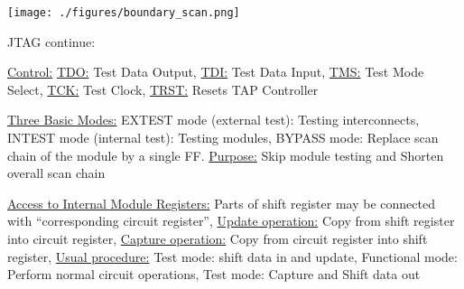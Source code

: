 \documentclass[landscape, a4paper]{article}
\begin{document}
\begin{minipage}[t]{0.2\linewidth}
\begin{betterlist}
		\texttt{[image: ./figures/boundary\_scan.png]}
		\item \alert{JTAG continue:}
		\begin{betterlist}
			\item \underline{Control:} \underline{TDO:} Test Data Output, \underline{TDI:} Test Data Input, \underline{TMS:} Test Mode Select, \underline{TCK:} Test Clock, \underline{TRST:} Resets TAP Controller
			\item \underline{Three Basic Modes:} \alert{EXTEST mode (external test):} Testing interconnects, \alert{INTEST mode (internal test):} Testing modules, \alert{BYPASS mode:} Replace scan chain of the module by a single FF. \underline{Purpose:} Skip module testing and Shorten overall scan chain
			\item \underline{Access to Internal Module Registers:} Parts of shift register may be connected with \enquote{corresponding circuit register}, \underline{Update operation:} Copy from shift register into circuit register, \underline{Capture operation:} Copy from circuit register into shift register, \underline{Usual procedure:} \alert{Test mode:} shift data in and update, \alert{Functional mode:} Perform normal circuit operations, \alert{Test mode:} Capture and Shift data out
		\end{betterlist}
	\end{betterlist}
\end{minipage}
\end{document}
